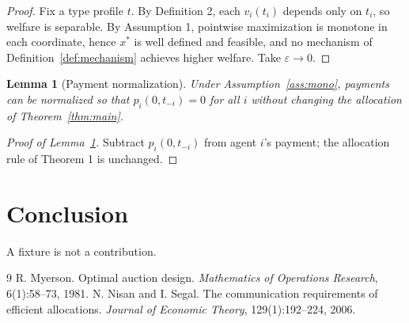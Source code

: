 \documentclass{article}
\newcommand{\val}{v_i(t_i)}
\providecommand{\eps}{\varepsilon}
\newtheorem{lemma}[theorem]{Lemma}
\begin{document}
\begin{proof}
Fix a type profile $t$. By Definition 2, each $\val$ depends only on $t_i$, so
welfare is separable. By Assumption 1, pointwise maximization is monotone in
each coordinate, hence $x^{*}$ is well defined and feasible, and no mechanism
of Definition~\ref{def:mechanism} achieves higher welfare. Take $\eps \to 0$.
\end{proof}

\begin{lemma}[Payment normalization]\label{lem:aux}
Under Assumption~\ref{ass:mono}, payments can be normalized so that
$p_i(0, t_{-i}) = 0$ for all $i$ without changing the allocation of
Theorem~\ref{thm:main}.
\end{lemma}

\begin{proof}[Proof of Lemma~\ref{lem:aux}]
Subtract $p_i(0, t_{-i})$ from agent $i$'s payment; the allocation rule of
Theorem 1 is unchanged.
\end{proof}

\section{Conclusion}
A fixture is not a contribution.

\begin{thebibliography}{9}
 R. Myerson. Optimal auction design. \emph{Mathematics of
Operations Research}, 6(1):58--73, 1981.
 N. Nisan and I. Segal. The communication requirements of
efficient allocations. \emph{Journal of Economic Theory}, 129(1):192--224, 2006.
\end{thebibliography}
\end{document}
